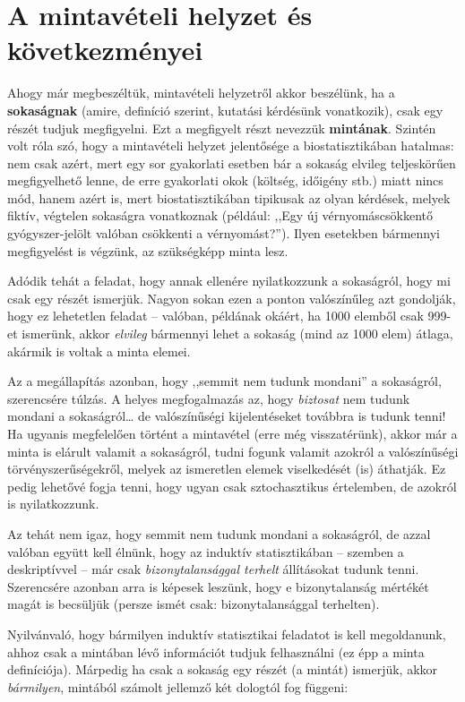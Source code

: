 \documentclass[]{book}
\begin{document}
\section{A mintavételi helyzet és
következményei}\label{induktivmintavetelihelyzet}

Ahogy már megbeszéltük, mintavételi helyzetről akkor beszélünk, ha a
\textbf{sokaságnak} (amire, definíció szerint, kutatási kérdésünk
vonatkozik), csak egy részét tudjuk megfigyelni. Ezt a megfigyelt részt
nevezzük \textbf{mintának}. Szintén volt róla szó, hogy a mintavételi
helyzet jelentősége a biostatisztikában hatalmas: nem csak azért, mert
egy sor gyakorlati esetben bár a sokaság elvileg teljeskörűen
megfigyelhető lenne, de erre gyakorlati okok (költség, időigény stb.)
miatt nincs mód, hanem azért is, mert biostatisztikában tipikusak az
olyan kérdések, melyek fiktív, végtelen sokaságra vonatkoznak (például:
,,Egy új vérnyomáscsökkentő gyógyszer-jelölt valóban csökkenti a
vérnyomást?''). Ilyen esetekben bármennyi megfigyelést is végzünk, az
szükségképp minta lesz.

Adódik tehát a feladat, hogy annak ellenére nyilatkozzunk a sokaságról,
hogy mi csak egy részét ismerjük. Nagyon sokan ezen a ponton
valószínűleg azt gondolják, hogy ez lehetetlen feladat -- valóban,
példának okáért, ha 1000 elemből csak 999-et ismerünk, akkor
\emph{elvileg} bármennyi lehet a sokaság (mind az 1000 elem) átlaga,
akármik is voltak a minta elemei.

Az a megállapítás azonban, hogy ,,semmit nem tudunk mondani'' a
sokaságról, szerencsére túlzás. A helyes megfogalmazás az, hogy
\emph{biztosat} nem tudunk mondani a sokaságról\dots{} de valószínűségi
kijelentéseket továbbra is tudunk tenni! Ha ugyanis megfelelően történt
a mintavétel (erre még visszatérünk), akkor már a minta is elárult
valamit a sokaságról, tudni fogunk valamit azokról a valószínűségi
törvényszerűségekről, melyek az ismeretlen elemek viselkedését (is)
áthatják. Ez pedig lehetővé fogja tenni, hogy ugyan csak sztochasztikus
értelemben, de azokról is nyilatkozzunk.

Az tehát nem igaz, hogy semmit nem tudunk mondani a sokaságról, de azzal
valóban együtt kell élnünk, hogy az induktív statisztikában -- szemben a
deskriptívvel -- már csak \emph{bizonytalansággal terhelt} állításokat
tudunk tenni. Szerencsére azonban arra is képesek leszünk, hogy e
bizonytalanság mértékét magát is becsüljük (persze ismét csak:
bizonytalansággal terhelten).

Nyilvánvaló, hogy bármilyen induktív statisztikai feladatot is kell
megoldanunk, ahhoz csak a mintában lévő információt tudjuk felhasználni
(ez épp a minta definíciója). Márpedig ha csak a sokaság egy részét (a
mintát) ismerjük, akkor \emph{bármilyen}, mintából számolt jellemző két
dologtól fog függeni:
\end{document}
